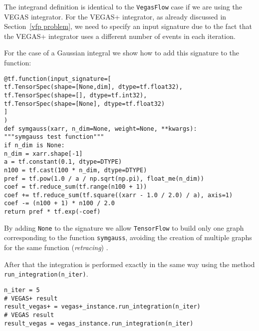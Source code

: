 \documentclass[../main/main.tex]{subfiles}
\begin{document}
The integrand definition is identical to the \texttt{VegasFlow} case if we are using the VEGAS integrator. 
For the VEGAS+ integrator, as already discussed in Section~\ref{vfp problem}, we need to specify an input signature due to the fact that the VEGAS+ integrator uses a different number of events in each iteration.

For the case of a Gaussian integral we show how to add this signature to the function:

\begin{verbatim}
@tf.function(input_signature=[
tf.TensorSpec(shape=[None,dim], dtype=tf.float32),
tf.TensorSpec(shape=[], dtype=tf.int32),
tf.TensorSpec(shape=[None], dtype=tf.float32)
]
)
def symgauss(xarr, n_dim=None, weight=None, **kwargs):
"""symgauss test function"""
if n_dim is None:
n_dim = xarr.shape[-1]
a = tf.constant(0.1, dtype=DTYPE)
n100 = tf.cast(100 * n_dim, dtype=DTYPE)
pref = tf.pow(1.0 / a / np.sqrt(np.pi), float_me(n_dim))
coef = tf.reduce_sum(tf.range(n100 + 1))
coef += tf.reduce_sum(tf.square((xarr - 1.0 / 2.0) / a), axis=1)
coef -= (n100 + 1) * n100 / 2.0
return pref * tf.exp(-coef)
\end{verbatim}

By adding \texttt{None} to the signature we allow \texttt{TensorFlow} to build only one graph corresponding to the function \texttt{symgauss}, avoiding the creation of multiple graphs for the same function (\emph{retracing}) .

After that the integration is performed exactly in the same way using the method \texttt{run\_integration(n\_iter)}.

\begin{verbatim}
n_iter = 5
# VEGAS+ result
result_vegas+ = vegas+_instance.run_integration(n_iter)
# VEGAS result
result_vegas = vegas_instance.run_integration(n_iter)
\end{verbatim}
\end{document}
